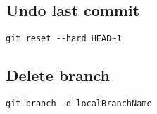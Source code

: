 \subsection{Undo last commit}
\verb|git reset --hard HEAD~1|

\subsection{Delete branch}
\verb|git branch -d localBranchName|
